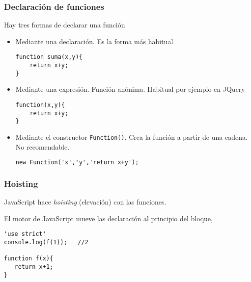 \documentclass[ucs]{beamer}
\begin{document}
\begin{frame}[fragile]
\frametitle{Declaración de funciones}

Hay tres formas de declarar una función


    \begin{itemize}
    \item
Mediante una declaración. Es la forma más habitual

  \begin{scriptsize}
  \begin{verbatim}
function suma(x,y){
    return x+y;
}
  \end{verbatim}
  \end{scriptsize}


    \item
Mediante una expresión. Función anónima. Habitual por ejemplo
en JQuery


  \begin{scriptsize}
  \begin{verbatim}
function(x,y){
    return x+y;
}
  \end{verbatim}
  \end{scriptsize}


    \item
Mediante el constructor
\verb|Function()|. Crea la función a partir de una cadena.
No recomendable.


  \begin{scriptsize}
  \begin{verbatim}
new Function('x','y','return x+y');
  \end{verbatim}
  \end{scriptsize}
    \end{itemize}

\end{frame}

\begin{frame}[fragile]
\frametitle{Hoisting}

JavaScript hace \emph{hoisting} (elevación) con las funciones.

El motor de JavaScript mueve las declaración al principio del bloque,


  \begin{scriptsize}
  \begin{verbatim}
'use strict'
console.log(f(1));   //2

function f(x){
   return x+1;
}

  \end{verbatim}
  \end{scriptsize}

\end{frame}
\end{document}
